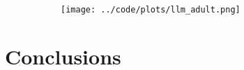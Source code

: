 \documentclass[letterpaper]{article} %
\begin{document}
\begin{figure}
	\centering
	\begin{subfigure}{0.5\textwidth}
		\caption{}
	\end{subfigure}
	\begin{subfigure}{0.5\textwidth}
		\centering
		\texttt{[image: ../code/plots/llm\_adult.png]}
		\caption{}
	\end{subfigure}
\end{figure}

\section{Conclusions}

\newpage

\end{document}
